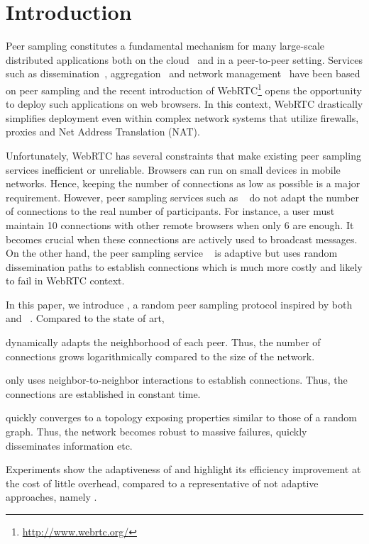 
\section{Introduction}

Peer sampling constitutes a fundamental mechanism for many large-scale
distributed applications both on the
cloud~\cite{decandia2007dynamo} and in a peer-to-peer
setting. Services such as dissemination~\cite{eugster2003lightweight,
  tolgyeski2009adaptive}, aggregation~\cite{jelasity2004epidemic} and
network management~\cite{jelasity2009tman, voulgaris2005epidemic} have
been based on peer sampling and the recent introduction of
WebRTC\footnote{\url{http://www.webrtc.org/}} opens the opportunity to
deploy such applications on web browsers.
In this context, WebRTC drastically simplifies deployment even within complex
network systems that utilize firewalls, proxies and Net Address Translation
(NAT).

Unfortunately, WebRTC has several constraints that make existing peer sampling
services inefficient or unreliable. Browsers can run on small devices in
mobile networks. Hence, keeping the number of connections as low as possible is
a major requirement. However, peer sampling services such as
\CYCLON~\cite{voulgaris2005cyclon} do not adapt the number of connections to the
real number of participants. For instance, a user must maintain 10 connections
with other remote browsers when only 6 are enough. It becomes crucial when these
connections are actively used to broadcast messages. On the other hand, the peer
sampling service \SCAMP~\cite{ganesh2003peer} is adaptive but uses random
dissemination paths to establish connections which is much more costly and
likely to fail in WebRTC context.

In this paper, we introduce \SPRAY, a random peer sampling protocol inspired by
both \SCAMP~\cite{ganesh2003peer}
and \CYCLON~\cite{voulgaris2005cyclon}. Compared to the state of art,
\begin{inparaenum}[(i)]
\item \SPRAY dynamically adapts the neighborhood of each peer. Thus, the number
  of connections grows logarithmically compared to the size of the network.
\item \SPRAY only uses neighbor-to-neighbor interactions to establish
  connections. Thus, the connections are established in constant time.
\item \SPRAY quickly converges to a topology exposing properties similar to
  those of a random graph. Thus, the network becomes robust to massive
  failures, quickly disseminates information etc.
\item Experiments show the adaptiveness of \SPRAY and highlight its efficiency
  improvement at the cost of little overhead, compared to a representative of
  not adaptive approaches, namely \CYCLON.
\end{inparaenum}


